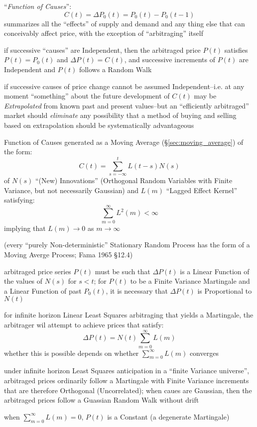 ``\emph{Function of Causes}'':
\[
  C(t) = \Delta P_0(t) = P_0(t) - P_0(t - 1)
\]
summarizes all the ``effects'' of supply and demand and any thing else that can
conceivably affect price, with the exception of ``arbitraging'' itself

if successive ``causes'' are Independent, then the arbitraged price $P(t)$
satisfies $P(t) = P_0(t)$ and $\Delta P(t) = C(t)$, and successive increments of
$P(t)$ are Independent and $P(t)$ follows a Random Walk

if successive causes of price change cannot be assumed Independent--i.e. at any
moment ``something'' about the future development of $C(t)$ may be
\emph{Extrapolated} from known past and present values--but an ``efficiently
arbitraged'' market should \emph{eliminate} any possibility that a method of
buying and selling based on extrapolation should be systematically advantageous

Function of Causes generated as a Moving Average (\S\ref{sec:moving_average}) of
the form:
\[
  C(t) = \sum_{s=-\infty}^t L(t-s) N(s)
\]
of $N(s)$ ``(New) Innovations'' (Orthogonal Random Variables with Finite
Variance, but not necessarily Gaussian) and $L(m)$ ``Lagged Effect Kernel''
satisfying:
\[
  \sum_{m=0}^\infty L^2(m) < \infty
\]
implying that $L(m) \to 0$ as $m \to \infty$

(every ``purely Non-deterministic'' Stationary Random Process has the form of a
Moving Averge Process; Fama 1965 \S 12.4)

arbitraged price series $P(t)$ must be such that $\Delta P(t)$ is a Linear
Function of the values of $N(s)$ for $s < t$; for $P(t)$ to be a Finite Variance
Martingale and a Linear Function of past $P_0(t)$, it is necessary that
$\Delta P(t)$ is Proportional to $N(t)$

for infinite horizon Linear Least Squares arbitraging that yields a Martingale,
the arbitrager wil attempt to achieve prices that satisfy:
\[
  \Delta P(t) = N(t) \sum_{m=0}^\infty L(m)
\]
whether this is possible depends on whether $\sum_{m=0}^\infty L(m)$ converges

under infinite horizon Least Squares anticipation in a ``finite Variance
universe'', arbitraged prices ordinarily follow a Martingale with Finite
Variance increments that are therefore Orthogonal (Uncorrelated); when caues are
Gaussian, then the arbitraged prices follow a Guassian Random Walk without drift

when $\sum_{m=0}^\infty L(m) = 0$, $P(t)$ is a Constant (a degenerate
Martingale)


